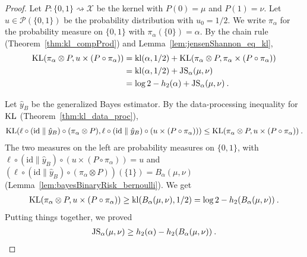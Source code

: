 \begin{proof}%
{}

Let $P : \{0,1\} \rightsquigarrow \mathcal X$ be the kernel with $P(0) = \mu$ and $P(1) = \nu$.
Let $u \in \mathcal P(\{0,1\})$ be the probability distribution with $u_0 = 1/2$. We write $\pi_\alpha$ for the probability measure on $\{0,1\}$ with $\pi_\alpha(\{0\}) = \alpha$. By the chain rule (Theorem~\ref{thm:kl_compProd}) and Lemma~\ref{lem:jensenShannon_eq_kl},
\begin{align*}
\operatorname{KL}(\pi_\alpha \otimes P, u \times (P \circ \pi_\alpha))
&= \operatorname{kl}(\alpha, 1/2) + \operatorname{KL}(\pi_\alpha \otimes P, \pi_\alpha \times (P \circ \pi_\alpha))
\\
&= \operatorname{kl}(\alpha, 1/2) + \operatorname{JS}_\alpha(\mu, \nu)
\\
&= \log 2 - h_2(\alpha) + \operatorname{JS}_\alpha(\mu, \nu)
\: .
\end{align*}

Let $\hat{y}_B$ be the generalized Bayes estimator. By the data-processing inequality for $\operatorname{KL}$ (Theorem~\ref{thm:kl_data_proc}),
\begin{align*}
\operatorname{KL}(\ell \circ (\mathrm{id} \parallel \hat{y}_B) \circ (\pi_\alpha \otimes P), \ell \circ (\mathrm{id} \parallel \hat{y}_B) \circ (u \times (P \circ \pi_\alpha)))
\le \operatorname{KL}(\pi_\alpha \otimes P, u \times (P \circ \pi_\alpha))
\: .
\end{align*}
The two measures on the left are probability measures on $\{0,1\}$, with $\ell \circ (\mathrm{id} \parallel \hat{y}_B) \circ (u \times (P \circ \pi_\alpha)) = u$ and $(\ell \circ (\mathrm{id} \parallel \hat{y}_B) \circ (\pi_\alpha \otimes P)) (\{1\}) = B_\alpha(\mu, \nu)$ (Lemma~\ref{lem:bayesBinaryRisk_bernoulli}).
We get
\begin{align*}
\operatorname{KL}(\pi_\alpha \otimes P, u \times (P \circ \pi_\alpha))
\ge \operatorname{kl}(B_\alpha(\mu, \nu), 1/2)
= \log 2 - h_2(B_\alpha(\mu, \nu))
\: .
\end{align*}
Putting things together, we proved
\begin{align*}
\operatorname{JS}_\alpha(\mu, \nu) \ge h_2(\alpha) - h_2(B_\alpha(\mu, \nu)) \: .
\end{align*}


\end{proof}
